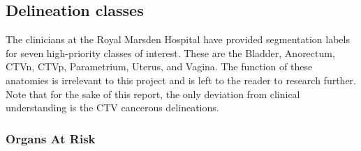 \documentclass[12pt,twoside]{report}
\begin{document}

\subsection{Delineation classes}

The clinicians at the Royal Marsden Hospital have provided segmentation labels for seven high-priority classes of interest. These are the Bladder, Anorectum, CTVn, CTVp, Parametrium, Uterus, and Vagina. The function of these anatomies is irrelevant to this project and is left to the reader to research further. Note that for the sake of this report, the only deviation from clinical understanding is the CTV cancerous delineations. %

\subsubsection{Organs At Risk}\label{sec:data-organs-at-risk}
\end{document}
